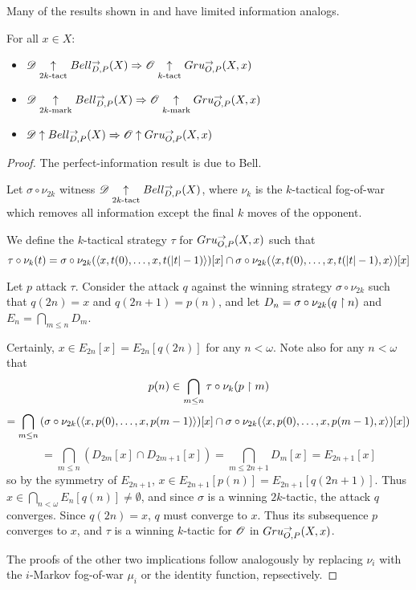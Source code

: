 Many of the results shown in \cite{MR3239205} and \cite{nyikosProximalPreprint}
have limited information analogs.

\begin{thm}
For all $x\in X$:
  \begin{itemize}
    \item
      $\mathscr{D}\underset{2k\text{-tact}}{\uparrow} Bell_{D,P}^{\to}(X) \Rightarrow \mathscr{O} \underset{k\text{-tact}}{\uparrow} Gru_{O,P}^{\to}(X,x)$
    \item
      $\mathscr{D}\underset{2k\text{-mark}}{\uparrow} Bell_{D,P}^{\to}(X) \Rightarrow \mathscr{O} \underset{k\text{-mark}}{\uparrow} Gru_{O,P}^{\to}(X,x)$
    \item
      $\mathscr{D}\uparrow Bell_{D,P}^{\to}(X) \Rightarrow \mathscr{O} \uparrow Gru_{O,P}^{\to}(X,x)$
  \end{itemize}
\end{thm}

\begin{proof}
The perfect-information result is due to Bell.

Let $\sigma\circ \nu_{2k}$ witness $\mathscr{D} \underset{2k\text{-tact}}{\uparrow} Bell_{D,P}^{\to}(X)$,
where $\nu_k$ is the $k$-tactical fog-of-war which removes all information
except the final $k$ moves of the opponent.

We define the $k$-tactical strategy $\tau$ for $Gru_{O,P}^{\to}(X,x)$ such that
  \[
    \tau\circ \nu_k(t)
      =
    \sigma\circ \nu_{2k}(\langle x,t(0),\dots,x,t(|t|-1)\rangle)[x]
      \cap
    \sigma\circ \nu_{2k}(\langle x,t(0),\dots,x,t(|t|-1),x\rangle)[x]
  \]

Let $p$ attack $\tau$. Consider the attack $q$ against the winning strategy
$\sigma\circ \nu_{2k}$ such that $q(2n)=x$ and $q(2n+1)=p(n)$, and let
$D_n=\sigma\circ \nu_{2k}(q\restriction n)$ and $E_n=\bigcap_{m\leq n}D_m$.

Certainly, $x\in E_{2n}[x]= E_{2n}[q(2n)]$ for any $n<\omega$.
Note also for any $n<\omega$ that
    \[
      p(n) \in
      \bigcap_{m\leq n}\tau\circ \nu_k(p\restriction m)
    \]
    \[
      =
      \bigcap_{m\leq n}\left(
        \sigma\circ \nu_{2k}(\langle x,p(0),\dots,x,p(m-1)\rangle)[x]\cap
        \sigma\circ \nu_{2k}(\langle x,p(0),\dots,x,p(m-1),x\rangle)[x]
      \right)
    \]
    \[
      =
      \bigcap_{m\leq n}\left(
        D_{2m}[x]\cap
        D_{2m+1}[x]
      \right) =
      \bigcap_{m\leq 2n+1} D_m[x]=E_{2n+1}[x]
    \]
so by the symmetry of $E_{2n+1}$, $x\in E_{2n+1}[p(n)]= E_{2n+1}[q(2n+1)]$.
Thus $x\in \bigcap_{n<\omega} E_n[q(n)]\not=\emptyset$, and since $\sigma$ is
a winning $2k$-tactic, the attack $q$ converges. Since $q(2n)=x$, $q$ must
converge to $x$. Thus its subsequence $p$ converges to $x$, and $\tau$ is a
winning $k$-tactic for $\mathscr{O}$ in $Gru_{O,P}^{\to}(X,x)$.

The proofs of the other two implications follow analogously by
replacing $\nu_i$ with the $i$-Markov fog-of-war $\mu_i$ or the identity
function, repsectively.
\end{proof}


